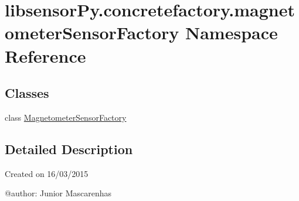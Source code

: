 \hypertarget{namespacelibsensorPy_1_1concretefactory_1_1magnetometerSensorFactory}{}\section{libsensor\+Py.\+concretefactory.\+magnetometer\+Sensor\+Factory Namespace Reference}
\label{namespacelibsensorPy_1_1concretefactory_1_1magnetometerSensorFactory}
\subsection*{Classes}
\begin{DoxyCompactItemize}
\item 
class \hyperlink{classlibsensorPy_1_1concretefactory_1_1magnetometerSensorFactory_1_1MagnetometerSensorFactory}{Magnetometer\+Sensor\+Factory}
\end{DoxyCompactItemize}


\subsection{Detailed Description}
\begin{DoxyVerb}Created on 16/03/2015

@author: Junior Mascarenhas
\end{DoxyVerb}
 